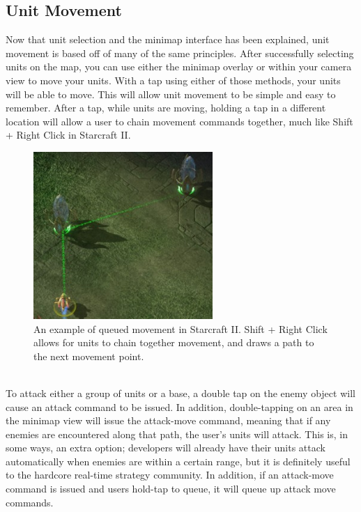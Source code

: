\documentclass[11pt]{article}
\begin{document}
	\subsection{Unit Movement}
	Now that unit selection and the minimap interface has been explained, unit movement is based off of many of the same principles. After successfully selecting units on the map, you can use either the minimap overlay or within your camera view to move your units. With a tap using either of those methods, your units will be able to move. This will allow unit movement to be simple and easy to remember. After a tap, while units are moving, holding a tap in a different location will allow a user to chain movement commands together, much like Shift + Right Click in Starcraft II.\\
	\begin{figure}[!ht]
	\begin{center}
	\includegraphics[height = 2.5in]{sc2-movement-queue}
	\caption{An example of queued movement in Starcraft II. Shift + Right Click allows for units to chain together movement, and draws a path to the next movement point.}
	\end{center}
	\end{figure} \\
	\indent To attack either a group of units or a base, a double tap on the enemy object will cause an attack command to be issued. In addition, double-tapping on an area in the minimap view will issue the attack-move command, meaning that if any enemies are encountered along that path, the user's units will attack. This is, in some ways, an extra option; developers will already have their units attack automatically when enemies are within a certain range, but it is definitely useful to the hardcore real-time strategy community. In addition, if an attack-move command is issued and users hold-tap to queue, it will queue up attack move commands.
\end{document}
